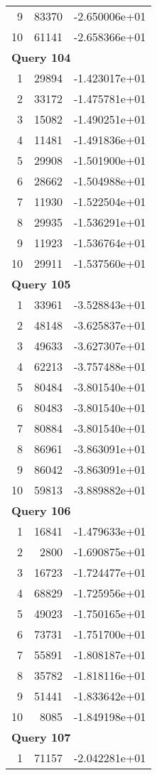 \begin{longtable}[{p}]{@{}rrp{}@{}}
9 & 83370 & -2.650006e+01 \\
10 & 61141 & -2.658366e+01 \\
\midrule
\multicolumn{3}{l}{\bfseries Query 104} \\
1 & 29894 & -1.423017e+01 \\
2 & 33172 & -1.475781e+01 \\
3 & 15082 & -1.490251e+01 \\
4 & 11481 & -1.491836e+01 \\
5 & 29908 & -1.501900e+01 \\
6 & 28662 & -1.504988e+01 \\
7 & 11930 & -1.522504e+01 \\
8 & 29935 & -1.536291e+01 \\
9 & 11923 & -1.536764e+01 \\
10 & 29911 & -1.537560e+01 \\
\midrule
\multicolumn{3}{l}{\bfseries Query 105} \\
1 & 33961 & -3.528843e+01 \\
2 & 48148 & -3.625837e+01 \\
3 & 49633 & -3.627307e+01 \\
4 & 62213 & -3.757488e+01 \\
5 & 80484 & -3.801540e+01 \\
6 & 80483 & -3.801540e+01 \\
7 & 80884 & -3.801540e+01 \\
8 & 86961 & -3.863091e+01 \\
9 & 86042 & -3.863091e+01 \\
10 & 59813 & -3.889882e+01 \\
\midrule
\multicolumn{3}{l}{\bfseries Query 106} \\
1 & 16841 & -1.479633e+01 \\
2 & 2800 & -1.690875e+01 \\
3 & 16723 & -1.724477e+01 \\
4 & 68829 & -1.725956e+01 \\
5 & 49023 & -1.750165e+01 \\
6 & 73731 & -1.751700e+01 \\
7 & 55891 & -1.808187e+01 \\
8 & 35782 & -1.818116e+01 \\
9 & 51441 & -1.833642e+01 \\
10 & 8085 & -1.849198e+01 \\
\midrule
\multicolumn{3}{l}{\bfseries Query 107} \\
1 & 71157 & -2.042281e+01 \\

\end{longtable}
